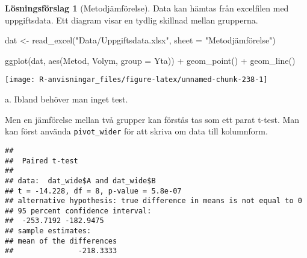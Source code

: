 \documentclass[
]{book}
\newenvironment{Shaded}{\begin{snugshade}}{\end{snugshade}}
\newcommand{\AttributeTok}[1]{\textcolor[rgb]{0.77,0.63,0.00}{#1}}
\newcommand{\FunctionTok}[1]{\textcolor[rgb]{0.00,0.00,0.00}{#1}}
\newcommand{\NormalTok}[1]{#1}
\newcommand{\OtherTok}[1]{\textcolor[rgb]{0.56,0.35,0.01}{#1}}
\newcommand{\SpecialCharTok}[1]{\textcolor[rgb]{0.00,0.00,0.00}{#1}}
\newcommand{\StringTok}[1]{\textcolor[rgb]{0.31,0.60,0.02}{#1}}
\theoremstyle{definition}
\theoremstyle{definition}
\theoremstyle{definition}
\theoremstyle{definition}
\newtheorem{hypothesis}{Lösningsförslag}[chapter]
\theoremstyle{remark}
\begin{document}
\begin{hypothesis}[Metodjämförelse]
Data kan hämtas från excelfilen med uppgiftsdata. Ett diagram visar en tydlig skillnad mellan grupperna.

\begin{Shaded}
\begin{Highlighting}[]
\NormalTok{dat }\OtherTok{\textless{}{-}} \FunctionTok{read\_excel}\NormalTok{(}\StringTok{"Data/Uppgiftsdata.xlsx"}\NormalTok{, }\AttributeTok{sheet =} \StringTok{"Metodjämförelse"}\NormalTok{)}

\FunctionTok{ggplot}\NormalTok{(dat, }\FunctionTok{aes}\NormalTok{(Metod, Volym, }\AttributeTok{group =}\NormalTok{ Yta)) }\SpecialCharTok{+}
  \FunctionTok{geom\_point}\NormalTok{() }\SpecialCharTok{+}
  \FunctionTok{geom\_line}\NormalTok{()}
\end{Highlighting}
\end{Shaded}

\begin{center}\texttt{[image: R-anvisningar\_files/figure-latex/unnamed-chunk-238-1]} \end{center}

a. Ibland behöver man inget test.

Men en jämförelse mellan två grupper kan förstås tas som ett parat t-test. Man kan först använda \texttt{pivot\_wider} för att skriva om data till kolumnform.

\begin{Shaded}
\end{Shaded}

\begin{verbatim}
## 
##  Paired t-test
## 
## data:  dat_wide$A and dat_wide$B
## t = -14.228, df = 8, p-value = 5.8e-07
## alternative hypothesis: true difference in means is not equal to 0
## 95 percent confidence interval:
##  -253.7192 -182.9475
## sample estimates:
## mean of the differences 
##               -218.3333
\end{verbatim}


\end{hypothesis}
\end{document}
